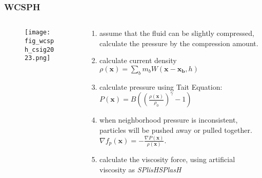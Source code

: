 \begin{frame}
    \frametitle{WCSPH}
    \begin{columns}[c]
        \begin{column}{0.38\textwidth} %
            \begin{figure}[H]
                \centering
                \texttt{[image: fig\_wcsph\_csig2023.png]}
            \end{figure}
        \end{column}
        \begin{column}{0.6\textwidth} %
            \begin{enumerate}
                \item assume that the fluid can be slightly compressed, calculate the pressure by the compression amount.
                \item calculate current density $\rho(\boldsymbol{x})=\sum_{b}m_bW(\boldsymbol{x}-\boldsymbol{x_b},h)$
                \item calculate pressure using Tait Equation: $P(\boldsymbol{x})=B((\frac{\rho(\boldsymbol{x})}{\rho_0})^{\gamma}-1)$
                \item when neighborhood pressure is inconsistent, particles will be pushed away or pulled together. $	\nabla f_p(\boldsymbol{x}) =-\frac{\nabla P(\boldsymbol{x})}{\rho(\boldsymbol{x})}.$
                \item calculate the viscosity force, using artificial viscosity as \textit{SPlisHSPlasH}
            \end{enumerate}
        \end{column}
    \end{columns}

\end{frame}

